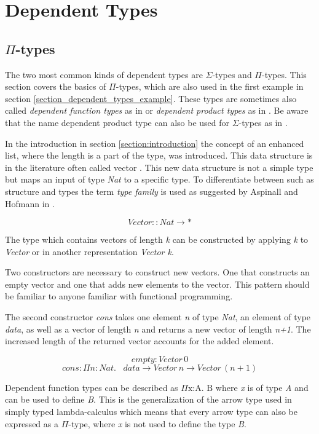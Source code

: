 \section{Dependent Types}\label{section:dependent_types}
\subsection{$\Pi$-types}
The two most common kinds of dependent types are $\Sigma$-types and $\Pi$-types.
This section covers the basics of $\Pi$-types, which are also used in the first example in section \ref{section_dependent_types_example}. 
These types are sometimes also called \emph{dependent function types} as in \cite{10.1145/2841316} or \emph{dependent product types} as in \cite{10.5555/1076265}. 
Be aware that the name dependent product type can also be used for $\Sigma$-types as in \cite{10.1145/2841316}.

In the introduction in section \ref{section:introduction} the concept of an enhanced list, where the length is a part of the type, was introduced.
This data structure is in the literature often called vector \cite{10.1145/2841316} \cite{10.5555/1076265}.
This new data structure is not a simple type but maps an input of type \emph{Nat} to a specific type. 
To differentiate between such as structure and types the term \emph{type family} is used as suggested by Aspinall and Hofmann in \cite{10.5555/1076265}.

$$Vector :: Nat \rightarrow *$$

The type which contains vectors of length \emph{k} can be constructed by applying \emph{k} to \emph{Vector} or in another representation \emph{Vector k}.

Two constructors are necessary to construct new vectors.
One that constructs an empty vector and one that adds new elements to the vector. 
This pattern should be familiar to anyone familiar with functional programming.

The second constructor \emph{cons} takes one element \emph{n} of type \emph{Nat}, an element of type \emph{data}, as well as a vector of length \emph{n} and returns a new vector of length \emph{n+1}. 
The increased length of the returned vector accounts for the added element.

$$empty: Vector \, 0$$
$$cons : \Pi n : Nat. \, \text{ } data \rightarrow Vector \, n \rightarrow Vector \, (n+1)$$

Dependent function types can be described as $\Pi \text{x:A. B}$ where \emph{x} is of type \emph{A} and can be used to define \emph{B}. 
This is the generalization of the arrow type used in simply typed lambda-calculus which means that every arrow type can also be expressed as a $\Pi$-type, where \emph{x} is not used to define the type \emph{B}.

